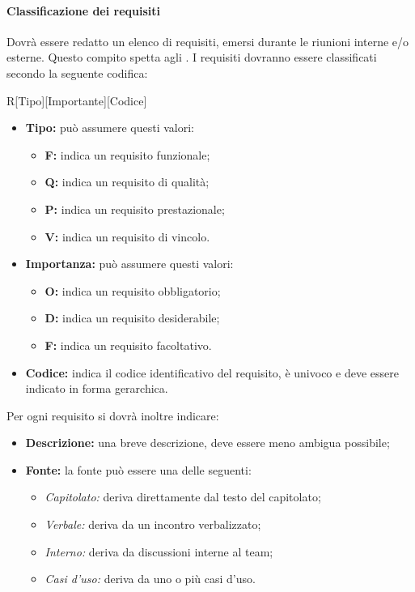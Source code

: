 \paragraph{Classificazione dei requisiti}
Dovrà essere redatto un elenco di requisiti, emersi durante le riunioni interne 
e/o esterne. Questo compito spetta agli \textit{\Anas}. I requisiti dovranno 
essere classificati secondo la seguente codifica:
\begin{center}
R[Tipo][Importante][Codice]
\end{center}
\begin{itemize} 
  \item \textbf{Tipo:} può assumere questi valori:
  \begin{itemize}
    \item \textbf{F:} indica un requisito funzionale;
    \item \textbf{Q:} indica un requisito di qualità;
    \item \textbf{P:} indica un requisito prestazionale;
    \item \textbf{V:} indica un requisito di vincolo.
  \end{itemize}
  \item \textbf{Importanza:} può assumere questi valori:
  \begin{itemize}
    \item \textbf{O:} indica un requisito obbligatorio;
    \item \textbf{D:} indica un requisito desiderabile;
    \item \textbf{F:} indica un requisito facoltativo.
  \end{itemize}
  \item \textbf{Codice:} indica il codice identificativo del requisito, è 
  univoco e deve essere indicato in forma gerarchica.
\end{itemize}
Per ogni requisito si dovrà inoltre indicare: 
\begin{itemize}
  \item \textbf{Descrizione:} una breve descrizione, deve essere meno ambigua possibile;
  \item \textbf{Fonte:} la fonte può essere una delle seguenti:
  \begin{itemize}
    \item \textit{Capitolato:} deriva direttamente dal testo del capitolato;
    \item \textit{Verbale:} deriva da un incontro verbalizzato;
    \item \textit{Interno:} deriva da discussioni interne al team;
    \item \textit{Casi d'uso:} deriva da uno o più casi d'uso.
  \end{itemize}
\end{itemize} 
